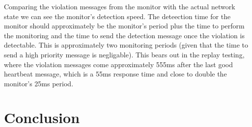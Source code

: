 \documentclass[]{../llncs/llncs}
\begin{document}
Comparing the violation messages from the monitor with the actual network state we can see the monitor's detection speed. 
The deteection time for the monitor should approximately be the monitor's period plus the time to perform the monitoring and the time to send the detection message once the violation is detectable. 
This is approximately two monitoring periods (given that the time to send a high priority message is negligable). This bears out in the replay testing, where the violation messages come approximately 555ms after the last good heartbeat message, which is a 55ms response time and close to double the monitor's 25ms period.



\section{Conclusion}



\end{document}
